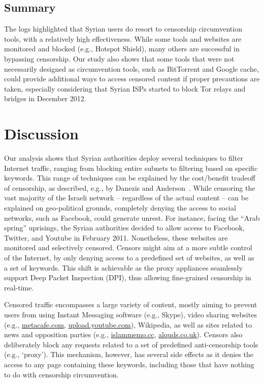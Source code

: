 \documentclass{sig-alternate-2013}
\newcommand{\descr}[1]{\smallskip\noindent{\bf #1}}
\begin{document}
\subsection{Summary}
The logs highlighted that Syrian users do resort to censorship circumvention tools, with a relatively high effectiveness. While some tools and websites are monitored and blocked (e.g., Hotspot Shield), many others are successful in bypassing censorship. Our study also shows that 
some tools that were not necessarily designed as circumvention tools, such as BitTorrent and Google cache, could provide additional ways to access censored content if proper precautions are taken, especially considering that Syrian ISPs started to block Tor relays and bridges in December 2012.


\section{Discussion}
\label{sec:discussion}


\descr{Economics of Censorship.} Our analysis shows that Syrian authorities deploy several techniques to filter Internet traffic, ranging from blocking entire subnets to filtering based on specific keywords. This range of techniques can be explained by the cost/benefit tradeoff of censorship, as described, e.g., by Danezis and 
Anderson~\cite{danezis}. While censoring the vast majority of the Israeli network -- regardless of the actual content -- can be explained on geo-political grounds, completely denying the access to social networks, such as Facebook, could generate unrest. For instance, facing the ``Arab spring'' uprisings, the Syrian authorities decided to allow access to Facebook, Twitter, and Youtube in February 2011.
Nonetheless, these websites are monitored and selectively censored. Censors might aim at a more subtle control of the Internet, by only denying access to a predefined set of websites, as well as a set of keywords. This shift is achievable as the proxy appliances seamlessly support Deep Packet Inspection (DPI), thus allowing fine-grained censorship in real-time.    

\descr{Censorship's target.} Censored traffic encompasses a large variety of content, mostly aiming to prevent users from using Instant Messaging software (e.g., Skype), video sharing websites (e.g., \url{metacafe.com},  \url{upload.youtube.com}), Wikipedia, as well as sites related to news and opposition parties (e.g., \url{islammemo.cc}, \url{alquds.co.uk}). Censors also deliberately block any requests related to a set of predefined anti-censorship tools (e.g., `proxy'). This mechanism, however, has several side effects as it denies the access to any page containing these keywords, including those that have nothing to do with censorship circumvention. 
\end{document}
